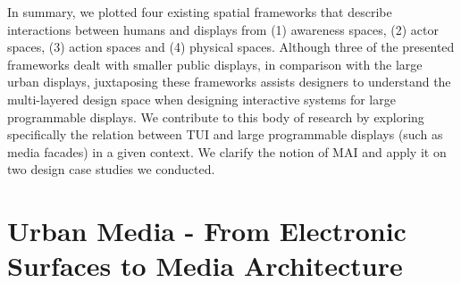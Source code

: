 In summary, we plotted four existing spatial frameworks that describe interactions between humans and displays from (1) awareness spaces, (2) actor spaces, (3) action spaces and (4) physical spaces. 
Although three of the presented frameworks dealt with smaller public displays, in comparison with the large urban displays, juxtaposing these frameworks assists designers to understand the multi-layered design space when designing interactive systems for large programmable displays. 
We contribute to this body of research by exploring specifically the relation between TUI and large programmable displays (such as media facades) in a given context. We clarify the notion of MAI and apply it on two design case studies we conducted.






\section{Urban Media - From Electronic Surfaces to Media Architecture}



